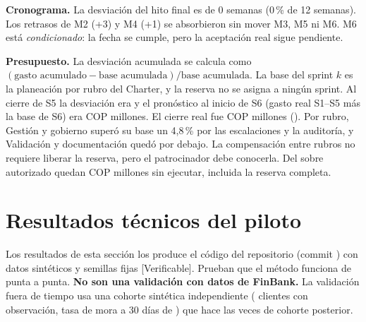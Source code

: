 \documentclass[10pt,a4paper]{article}
\newcommand{\rot}[1]{\textsf{\scriptsize\color{gris}[#1]}}
\begin{document}
\begin{table}[h]
\caption{Registro de hitos}\label{tab:ms}

\end{table}

\textbf{Cronograma.} La desviación del hito final es de 0 semanas (0\,\% de 12 semanas). Los retrasos de M2 (+3) y M4 (+1) se absorbieron sin mover M3, M5 ni M6. M6 está \emph{condicionado}: la fecha se cumple, pero la aceptación real sigue pendiente.

\textbf{Presupuesto.} La desviación acumulada se calcula como $(\text{gasto acumulado} - \text{base acumulada}) / \text{base acumulada}$. La base del sprint $k$ es la planeación por rubro del Charter, y la reserva no se asigna a ningún sprint. Al cierre de S5 la desviación era \DesvScinco{} y el pronóstico al inicio de S6 (gasto real S1--S5 más la base de S6) era COP \EACSseis{} millones. El cierre real fue COP \GastoTotal{} millones (\DesvCosto). Por rubro, Gestión y gobierno superó su base un 4,8\,\% por las escalaciones y la auditoría, y Validación y documentación quedó por debajo. La compensación entre rubros no requiere liberar la reserva, pero el patrocinador debe conocerla. Del sobre autorizado quedan COP \NoEjecutado{} millones sin ejecutar, incluida la reserva completa.

\begin{table}[h]
\caption{Base y gasto por sprint (COP millones)}

\vspace{0.6em}
\caption{Base y gasto por rubro del Charter}

\end{table}

\section{Resultados técnicos del piloto}

Los resultados de esta sección los produce el código del repositorio (commit \texttt{\SHA}) con datos sintéticos y semillas fijas \rot{Verificable}. Prueban que el método funciona de punta a punta. \textbf{No son una validación con datos de FinBank.} La validación fuera de tiempo usa una cohorte sintética independiente (\MuestraOOT{} clientes con observación, tasa de mora a 30 días de \TasaMora) que hace las veces de cohorte posterior.

\begin{table}[h]
\caption{Métricas del prototipo (\texttt{pilot\_metrics.csv})}\label{tab:pilot}

\end{table}
\end{document}
